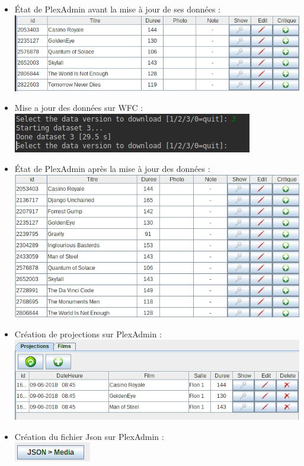 \documentclass[a4paper]{article}
\begin{document}
\begin{itemize}
 \item État de PlexAdmin avant la mise à jour de ses données :\\ 
 \includegraphics[scale=0.5]{beforeUpdate.png}
 \item Mise a jour des données sur WFC : \\ 
 \includegraphics[scale=0.5]{updateDatabase.png}
 \item État de PlexAdmin après la mise à jour des données :\\ 
 \includegraphics[scale=0.5]{AfterUpdate.png}
 \item Création de projections sur PlexAdmin :\\ 
 \includegraphics[scale=0.5]{SelectProjection.png}
 \item Création du fichier Json sur PlexAdmin :\\ 
 \includegraphics[scale=0.5]{CreateJson.png}

\end{itemize}
\end{document}
